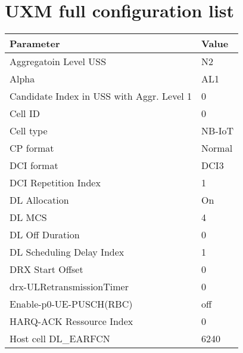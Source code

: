 \section{UXM full configuration list}

\begin{longtable}{|p{8cm}|p{5cm}|} \hline
\textbf{Parameter}                                      & \textbf{Value}     \\ \hline
Aggregatoin Level USS                                   & N2                 \\ \hline
Alpha                                                   & AL1                \\ \hline
Candidate Index in USS with Aggr. Level 1               & 0                  \\ \hline
Cell ID                                                 & 0                  \\ \hline
Cell type                                               & NB-IoT             \\ \hline
CP format                                               & Normal             \\ \hline
DCI format                                              & DCI3               \\ \hline
DCI Repetition Index                                    & 1                  \\ \hline
DL Allocation                                           & On                 \\ \hline
DL MCS                                                  & 4                  \\ \hline
DL Off Duration                                         & 0                  \\ \hline
DL  Scheduling Delay Index                              & 1                  \\ \hline
DRX Start Offset                                        & 0                  \\ \hline
drx-ULRetransmissionTimer                               & 0                  \\ \hline
Enable-p0-UE-PUSCH(RBC)                                 & off                \\ \hline
HARQ-ACK Ressource Index                                & 0                  \\ \hline
Host cell DL\_EARFCN                                    & 6240               \\ \hline

\end{longtable}

